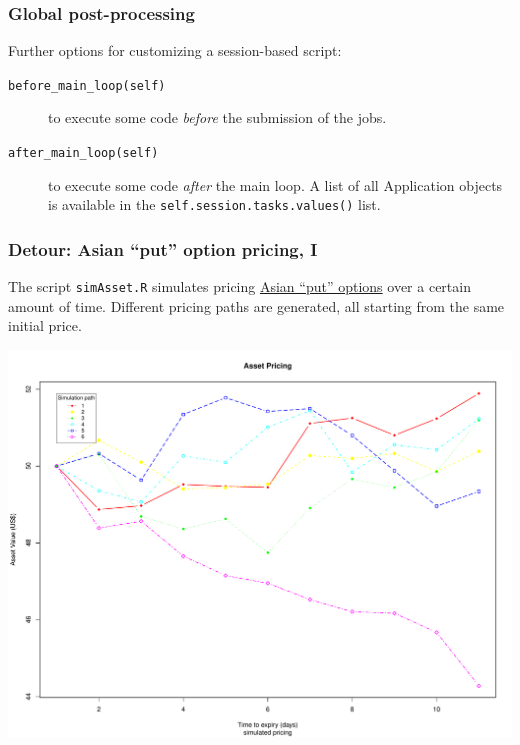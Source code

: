 \documentclass[english,serif,mathserif,xcolor=pdftex,dvipsnames,table]{beamer}
\begin{document}
\begin{frame}
  \frametitle{Global post-processing}
Further options for customizing a session-based script:
\begin{description}
\item [\texttt{before\_main\_loop(self)}] to execute some code
  \emph{before} the submission of the jobs.
\item [\texttt{after\_main\_loop(self)}] to execute some code
  \emph{after} the main loop. A list of all Application objects is
  available in the \lstinline|self.session.tasks.values()| list.
\end{description}
\end{frame}


\begin{frame}
  \frametitle{Detour: Asian ``put'' option pricing, I}
  \small
  The script \texttt{simAsset.R} simulates pricing
  \href{https://en.wikipedia.org/wiki/Asian_option}{Asian ``put''
    options} over a certain amount of time.  Different pricing paths
  are generated, all starting from the same initial price.
  \begin{center}
    \includegraphics[width=0.75\linewidth]{fig/simAsset.pdf}
  \end{center}
\end{frame}
\end{document}
